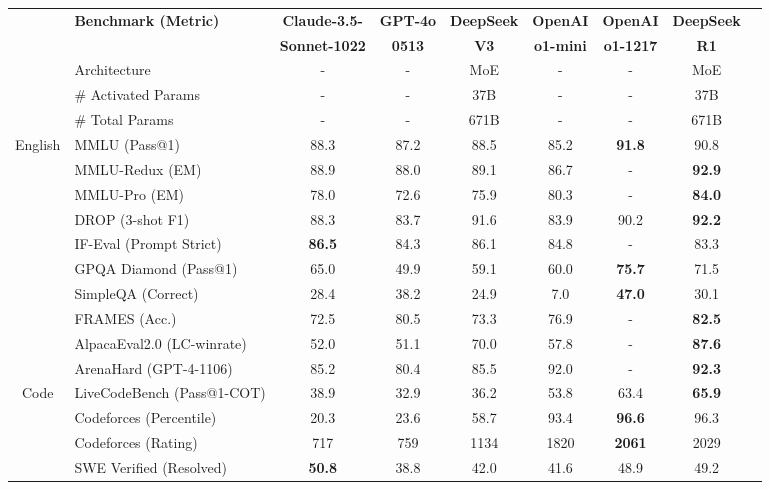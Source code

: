 \begin{table}[h]
    \centering
    \footnotesize
    \setlength{\tabcolsep}{1.9pt}
    \begin{tabular}{@{}c l | c  c  c | c c |c c@{}}
    \toprule
    & \multirow{2}{*}{\centering \textbf{Benchmark {\tiny (Metric)}}}  & \textbf{Claude-3.5-}  & \textbf{GPT-4o}& \textbf{DeepSeek} & \textbf{OpenAI} & \textbf{OpenAI} & \textbf{DeepSeek}\\
    & & \textbf{Sonnet-1022}  & \textbf{0513} & \textbf{V3} & \textbf{o1-mini}& \textbf{o1-1217} &\textbf{R1} \\
    \midrule
    & Architecture &-&- & MoE &-&-& MoE \\
    & \# Activated Params& -&-& 37B&-&- & 37B \\
    & \# Total Params &-&-& 671B&-&- & 671B \\
    \midrule
    \multirow{10}{*}{English}& MMLU {\tiny (Pass@1)} & 88.3&87.2 & 88.5 & 85.2 & \textbf{91.8} & 90.8\\
     & MMLU-Redux {\tiny (EM)}& 88.9& 88.0 & 89.1 & 86.7&- & \textbf{92.9} \\
    & MMLU-Pro {\tiny (EM)}  & 78.0 & 72.6 & 75.9 & 80.3 &-& \textbf{84.0} \\
    & DROP {\tiny (3-shot F1)}  & 88.3 & 83.7 & 91.6 & 83.9 & 90.2 & \textbf{92.2}\\
    & IF-Eval {\tiny (Prompt Strict)}  & \textbf{86.5} & 84.3 & 86.1 & 84.8&- & 83.3 \\
    & GPQA Diamond {\tiny (Pass@1)}& 65.0 & 49.9 & 59.1 & 60.0 & \textbf{75.7} & 71.5&  \\
    & SimpleQA {\tiny (Correct)} & 28.4 & 38.2& 24.9 & 7.0 & \textbf{47.0} & 30.1 \\
     & FRAMES {\tiny (Acc.)}  & 72.5 & 80.5 & 73.3 & 76.9 & -&\textbf{82.5}\\
      & AlpacaEval2.0 {\tiny (LC-winrate)}  & 52.0 &  51.1 & 70.0 & 57.8 & - & \textbf{87.6}\\
       & ArenaHard {\tiny (GPT-4-1106)}  & 85.2 & 80.4 & 85.5 & 92.0 & - & \textbf{92.3}\\
    \midrule
    \multirow{4}{*}{Code} & LiveCodeBench {\tiny (Pass@1-COT)} & 38.9 & 32.9 & 36.2 & 53.8 & 63.4 & \textbf{65.9} \\
    & Codeforces {\tiny (Percentile)}& 20.3 & 23.6 & 58.7 & 93.4 & \textbf{96.6} & 96.3 \\
    & Codeforces {\tiny (Rating)}& 717 & 759 & 1134 & 1820 & \textbf{2061} & 2029 \\
    & SWE Verified {\tiny (Resolved)} & \textbf{50.8}&38.8&42.0 & 41.6 & 48.9 & 49.2\\

\end{tabular}
\end{table}
